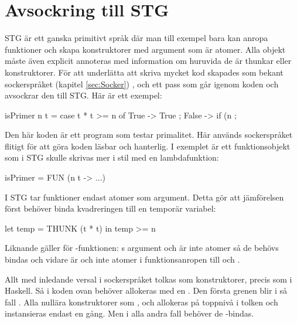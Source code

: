 \documentclass[../Core]{subfiles}
\begin{document}
\section{Avsockring till STG}
\label{sec:Diabetes}

STG är ett ganska primitivt språk där man till exempel bara kan anropa funktioner
och skapa konstruktorer med argument som är atomer. Alla objekt måste även
explicit annoteras med information om huruvida de är thunkar eller konstruktorer. För att underlätta
att skriva mycket kod skapades som bekant sockerspråket (kapitel \ref{sec:Socker})
, och ett
pass som går igenom koden och avsockrar den till STG. Här är ett exempel:

\begin{codeEx}
isPrimer n t = case t * t >= n of
    { True -> True
    ; False -> if (n %
    };
\end{codeEx}

Den här koden är ett program som testar
primalitet. Här används sockerspråket flitigt för att göra koden läsbar
och hanterlig. I exemplet är  ett funktionsobjekt som i 
STG skulle skrivas mer i stil med en lambdafunktion:

\begin{codeEx}          
isPrimer = FUN (n t -> ...)
\end{codeEx}


I STG tar funktioner endast atomer som argument. Detta gör att 
jämförelsen  först behöver binda kvadreringen
till en temporär variabel:

\begin{codeEx}
let temp = THUNK (t * t)
in  temp >= n
\end{codeEx}

Liknande gäller för -funktionen: s argument  och 
 är inte atomer så de behövs bindas och vidare
är  och  inte atomer i  
funktionsanropen till \miniCode{==} och .


Allt med inledande versal i sockerspråket tolkas som konstruktorer,
precis som i Haskell. Så  i koden ovan behöver allokeras med
en . Den första grenen blir i så fall
  .
Alla nullära konstruktorer som ,  och  
allokeras på toppnivå i tolken och instansieras endast en gång. 
Men i alla andra fall behöver de -bindas.
\end{document}
